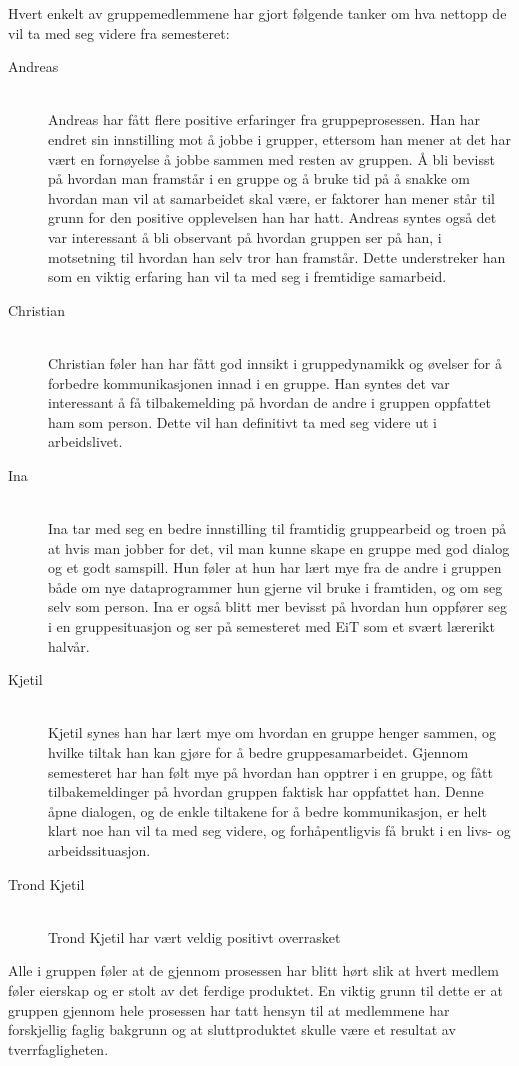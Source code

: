 Hvert enkelt av gruppemedlemmene har gjort følgende tanker om hva nettopp de vil ta med seg videre fra semesteret:
\begin{description}
\item[Andreas] \hfill \\
Andreas har fått flere positive erfaringer fra gruppeprosessen. Han har endret sin innstilling mot å jobbe i grupper, ettersom han mener at det har vært en fornøyelse å jobbe sammen med resten av gruppen. Å bli bevisst på hvordan man framstår i en gruppe og å bruke tid på å snakke om hvordan man vil at samarbeidet skal være, er faktorer han mener står til grunn for den positive opplevelsen han har hatt. Andreas syntes også det var interessant å bli observant på hvordan gruppen ser på han, i motsetning til hvordan han selv tror han framstår. Dette understreker han som en viktig erfaring han vil ta med seg i fremtidige samarbeid.

\item[Christian] \hfill \\
Christian føler han har fått god innsikt i gruppedynamikk og øvelser for å forbedre kommunikasjonen innad i en gruppe. Han syntes det var interessant å få tilbakemelding på hvordan de andre i gruppen oppfattet ham som person. Dette vil han definitivt ta med seg videre ut i arbeidslivet.  

\item[Ina] \hfill \\
Ina tar med seg en bedre innstilling til framtidig gruppearbeid og troen på at hvis man jobber for 
det, vil man kunne skape en gruppe med god dialog og et godt samspill. Hun føler at hun har lært mye fra de andre
i gruppen både om nye dataprogrammer hun gjerne vil bruke i framtiden, og om seg selv som person.
Ina er også blitt mer bevisst på hvordan hun oppfører seg i en gruppesituasjon og ser på semesteret med
EiT som et svært lærerikt halvår.

\item[Kjetil] \hfill \\
Kjetil synes han har lært mye om hvordan en gruppe henger sammen, og
hvilke tiltak han kan gjøre for å bedre gruppesamarbeidet. Gjennom
semesteret har han følt mye på hvordan han opptrer i en gruppe, og fått
tilbakemeldinger på hvordan gruppen faktisk har oppfattet han. Denne
åpne dialogen, og de enkle tiltakene for å bedre kommunikasjon, er helt
klart noe han vil ta med seg videre, og forhåpentligvis få brukt i en
livs- og arbeidssituasjon.

\item[Trond Kjetil] \hfill \\
Trond Kjetil har vært veldig positivt overrasket

\end{description}
Alle i gruppen føler at de gjennom prosessen har blitt hørt slik at hvert medlem føler eierskap og er stolt av det ferdige produktet. 
En viktig grunn til dette er at gruppen gjennom hele prosessen har tatt hensyn til at medlemmene har forskjellig faglig bakgrunn og 
at sluttproduktet skulle være et resultat av tverrfagligheten.


